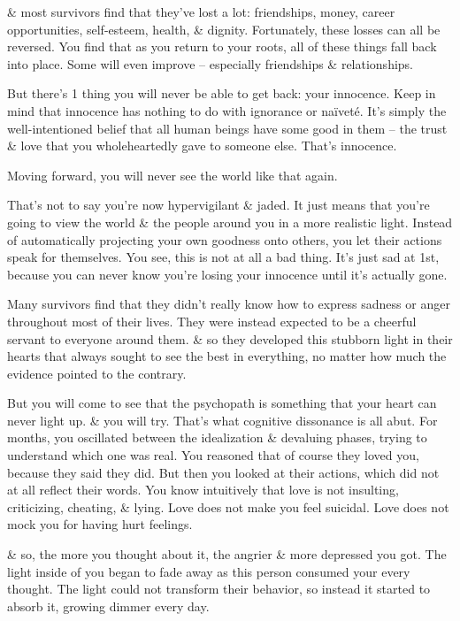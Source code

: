 \documentclass{article}
\numberwithin{equation}{section}
\begin{document}
\& most survivors find that they've lost a lot: friendships, money, career opportunities, self-esteem, health, \& dignity. Fortunately, these losses can all be reversed. You find that as you return to your roots, all of these things fall back into place. Some will even improve -- especially friendships \& relationships.

But there's 1 thing you will never be able to get back: your innocence. Keep in mind that innocence has nothing to do with ignorance or na\"ivet\'e. It's simply the well-intentioned belief that all human beings have some good in them -- the trust \& love that you wholeheartedly gave to someone else. That's innocence.

Moving forward, you will never see the world like that again.

That's not to say you're now hypervigilant \& jaded. It just means that you're going to view the world \& the people around you in a more realistic light. Instead of automatically projecting your own goodness onto others, you let their actions speak for themselves. You see, this is not at all a bad thing. It's just sad at 1st, because you can never know you're losing your innocence until it's actually gone.

Many survivors find that they didn't really know how to express sadness or anger throughout most of their lives. They were instead expected to be a cheerful servant to everyone around them. \& so they developed this stubborn light in their hearts that always sought to see the best in everything, no matter how much the evidence pointed to the contrary.

But you will come to see that the psychopath is something that your heart can never light up. \& you will try. That's what cognitive dissonance is all abut. For months, you oscillated between the idealization \& devaluing phases, trying to understand which one was real. You reasoned that of course they loved you, because they said they did. But then you looked at their actions, which did not at all reflect their words. You know intuitively that love is not insulting, criticizing, cheating, \& lying. Love does not make you feel suicidal. Love does not mock you for having hurt feelings.

\& so, the more you thought about it, the angrier \& more depressed you got. The light inside of you began to fade away as this person consumed your every thought. The light could not transform their behavior, so instead it started to absorb it, growing dimmer every day.
\end{document}
